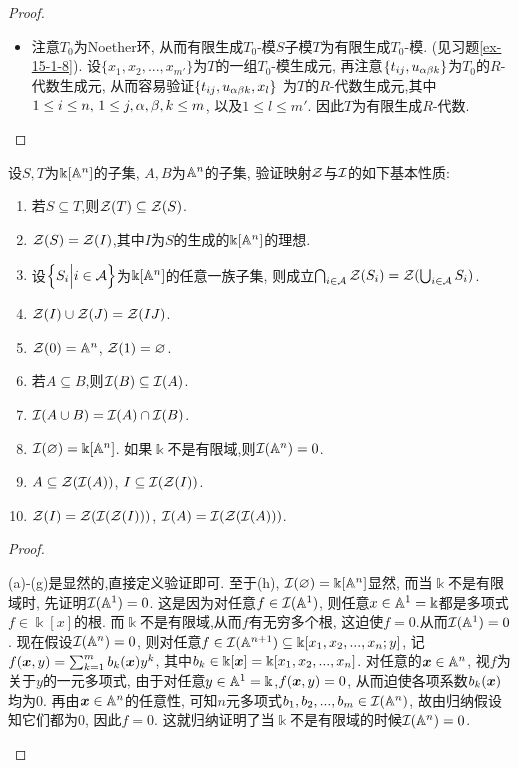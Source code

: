 \documentclass[oneside,a4papar,11pt,UTF8]{book}
\begin{document}
\begin{enumerate}
\begin{proof}
\begin{itemize}
    \item 注意$T_0$为Noether环,
    从而有限生成$T_0$-模$S$子模$T$为有限生成$T_0$-模.
    (见习题\ref{ex-15-1-8}).
    设$\{x_1,x_2,...,x_{m'}\}$为$T$的一组$T_0$-模生成元,
    再注意$\{t_{ij},u_{\alpha\beta k}\}$为$T_0$的$R$-代数生成元,
    从而容易验证$\{t_{ij},u_{\alpha\beta k},x_l\}$
    为$T$的$R$-代数生成元,其中$1\leq i\leq n,\,1\leq j,\alpha,\beta,k\leq m$,
    以及$1\leq l\leq m'$.
    因此$T$为有限生成$R$-代数.
  \end{itemize}
  \end{proof}

  \begin{prob}\label{ex-15-1-13}
   设$S,T$为$\Bbbk[\mathbb{A}^n]$的子集,
   $A,B$为$\mathbb{A}^n$的子集,
   验证映射$\mathcal{Z}$与$\mathcal{I}$的如下基本性质:
   \begin{enumerate}
     \item 若$S\subseteq T$,则$\mathcal{Z}(T)\subseteq\mathcal{Z}(S)$.
     \item $\mathcal{Z}(S)=\mathcal{Z}(I)$,其中$I$为$S$的生成的$\Bbbk[\mathbb{A}^n]$的理想.
     \item 设$\Big\{ S_i \Big| i\in\mathcal{A} \Big\}$为$\Bbbk[\mathbb{A}^n]$的任意一族子集,
     则成立$\bigcap_{i\in\mathcal{A}}\mathcal{Z}(S_i)=\mathcal{Z}(\bigcup_{i\in\mathcal{A}}S_i)$.
     \item $\mathcal{Z}(I)\cup\mathcal{Z}(J)=\mathcal{Z}(IJ)$.
     \item $\mathcal{Z}(0)=\mathbb{A}^n$, $\mathcal{Z}(1)=\varnothing$.
     \item 若$A\subseteq B$,则$\mathcal{I}(B)\subseteq\mathcal{I}(A)$.
     \item $\mathcal{I}(A\cup B)=\mathcal{I}(A)\cap\mathcal{I}(B)$.
     \item $\mathcal{I}(\varnothing)=\Bbbk[\mathbb{A}^n]$.
     如果$\Bbbk$不是有限域,则$\mathcal{I}(\mathbb{A}^n)=0$.
     \item $A\subseteq\mathcal{Z}(\mathcal{I}(A))$,
           $I\subseteq\mathcal{I}(\mathcal{Z}(I))$.
     \item $\mathcal{Z}(I)=\mathcal{Z}(\mathcal{I}(\mathcal{Z}(I)))$,
           $\mathcal{I}(A)=\mathcal{I}(\mathcal{Z}(\mathcal{I}(A)))$.
   \end{enumerate}
  \end{prob}

  \begin{proof}
    \begin{itemize}
      (a)-(g)是显然的,直接定义验证即可.
      至于(h), $\mathcal{I}(\varnothing)=\Bbbk[\mathbb{A}^n]$显然,
      而当$\Bbbk$不是有限域时,
      先证明$\mathcal{I}(\mathbb{A}^1)=0$.
      这是因为对任意$f\in\mathcal{I}(\mathbb{A}^1)$,
      则任意$x\in\mathbb{A}^1=\Bbbk$都是多项式$f\in\Bbbk[x]$的根.
      而$\Bbbk$不是有限域,从而$f$有无穷多个根,
      这迫使$f=0$.从而$\mathcal{I}(\mathbb{A}^1)=0$.
      现在假设$\mathcal{I}(\mathbb{A}^n)=0$,
      则对任意$f\in\mathcal{I}(\mathbb{A}^{n+1})\subseteq\Bbbk[x_1,x_2,...,x_n; y]$,
      记$f(\boldsymbol{x},y)=\sum_{k=1}^{m}b_k(\boldsymbol{x})y^k$,
      其中$b_k\in\Bbbk[\boldsymbol{x}]=\Bbbk[x_1,x_2,...,x_n]$.
      对任意的$\boldsymbol{x}\in\mathbb{A}^n$,
      视$f$为关于$y$的一元多项式,
      由于对任意$y\in\mathbb{A}^1=\Bbbk$,$f(\boldsymbol{x},y)=0$,
      从而迫使各项系数$b_k(\boldsymbol{x})$均为$0$.
      再由$\boldsymbol{x}\in\mathbb{A}^n$的任意性,
      可知$n$元多项式$b_1,b_2,...,b_m\in\mathcal{I}(\mathbb{A}^n)$,
      故由归纳假设知它们都为$0$,
      因此$f=0$.
      这就归纳证明了当$\Bbbk$不是有限域的时候$\mathcal{I}(\mathbb{A}^n)=0$.


\end{itemize}
\end{proof}
\end{enumerate}
\end{document}

